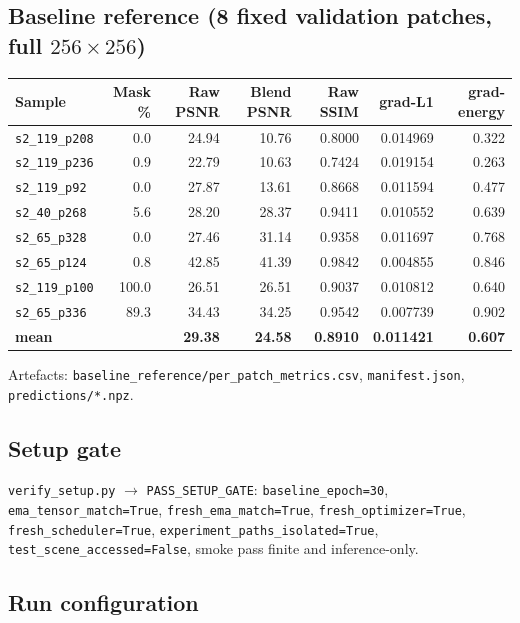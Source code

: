\documentclass[10pt,a4paper]{article}
\newcommand{\code}[1]{\texttt{#1}}
\begin{document}
\subsection{Baseline reference (8 fixed validation patches, full $256\times256$)}

\begin{center}
\begin{tabular}{@{}lrrrrrr@{}}
\hline
Sample & Mask \% & Raw PSNR & Blend PSNR & Raw SSIM & grad-L1 & grad-energy \\
\hline
\code{s2\_119\_p208} & 0.0 & 24.94 & 10.76 & 0.8000 & 0.014969 & 0.322 \\
\code{s2\_119\_p236} & 0.9 & 22.79 & 10.63 & 0.7424 & 0.019154 & 0.263 \\
\code{s2\_119\_p92}  & 0.0 & 27.87 & 13.61 & 0.8668 & 0.011594 & 0.477 \\
\code{s2\_40\_p268}  & 5.6 & 28.20 & 28.37 & 0.9411 & 0.010552 & 0.639 \\
\code{s2\_65\_p328}  & 0.0 & 27.46 & 31.14 & 0.9358 & 0.011697 & 0.768 \\
\code{s2\_65\_p124}  & 0.8 & 42.85 & 41.39 & 0.9842 & 0.004855 & 0.846 \\
\code{s2\_119\_p100} & 100.0 & 26.51 & 26.51 & 0.9037 & 0.010812 & 0.640 \\
\code{s2\_65\_p336}  & 89.3 & 34.43 & 34.25 & 0.9542 & 0.007739 & 0.902 \\
\hline
\textbf{mean} & & \textbf{29.38} & \textbf{24.58} & \textbf{0.8910} & \textbf{0.011421} & \textbf{0.607} \\
\hline
\end{tabular}
\end{center}

Artefacts: \code{baseline\_reference/per\_patch\_metrics.csv}, \code{manifest.json},
\code{predictions/*.npz}.

\subsection{Setup gate}

\code{verify\_setup.py} $\rightarrow$ \code{PASS\_SETUP\_GATE}:
\code{baseline\_epoch=30}, \code{ema\_tensor\_match=True}, \code{fresh\_ema\_match=True},
\code{fresh\_optimizer=True}, \code{fresh\_scheduler=True},
\code{experiment\_paths\_isolated=True}, \code{test\_scene\_accessed=False},
smoke pass finite and inference-only.

\subsection{Run configuration}
\end{document}
